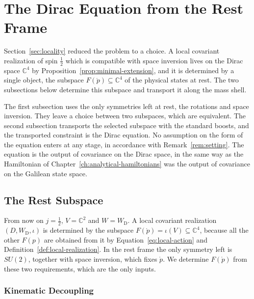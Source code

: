 	\section{The Dirac Equation from the Rest Frame}
	\label{sec:dirac-equation}
	
	Section~\ref{sec:locality} reduced the problem to a choice. A local covariant realization of spin $\frac12$ which is compatible with space inversion lives on the Dirac space $\mathbb{C}^4$ by Proposition~\ref{prop:minimal-extension}, and it is determined by a single object, the subspace $F(\mathring{p})\subseteq\mathbb{C}^4$ of the physical states at rest. The two subsections below determine this subspace and transport it along the mass shell.
	
	The first subsection uses the only symmetries left at rest, the rotations and space inversion. They leave a choice between two subspaces, which are equivalent. The second subsection transports the selected subspace with the standard boosts, and the transported constraint is the Dirac equation. No assumption on the form of the equation enters at any stage, in accordance with Remark~\ref{rem:setting}. The equation is the output of covariance on the Dirac space, in the same way as the Hamiltonian of Chapter~\ref{ch:analytical-hamiltonians} was the output of covariance on the Galilean state space.
	
	\subsection{The Rest Subspace}\label{sec:rest}
	
	From now on $j=\frac12$, $V=\mathbb{C}^2$ and $W=W_{\mathrm{D}}$. A local covariant realization $(D,W_{\mathrm{D}},\iota)$ is determined by the subspace $F(\mathring{p})=\iota(V)\subseteq\mathbb{C}^4$, because all the other $F(p)$ are obtained from it by Equation~\eqref{eq:local-action} and Definition~\ref{def:local-realization}. In the rest frame the only symmetry left is $SU(2)$, together with space inversion, which fixes $\mathring{p}$. We determine $F(\mathring{p})$ from these two requirements, which are the only inputs.
	
	\subsubsection*{Kinematic Decoupling}
	
